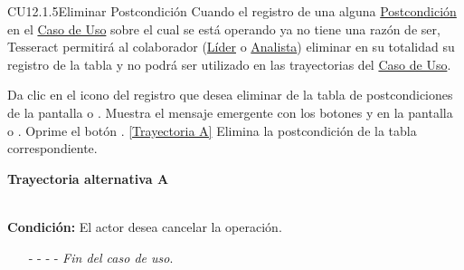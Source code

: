 	\begin{UseCase}{CU12.1.5}{Eliminar Postcondición}{
		Cuando el registro de una  alguna \hyperlink{entidadPostcondicion}{Postcondición} en el \hyperlink{casoUso}{Caso de Uso} sobre el cual se está operando ya no tiene una razón de ser, Tesseract permitirá al colaborador (\hyperlink{jefe}{Líder} o \hyperlink{analista}{Analista}) eliminar en su totalidad su registro de la tabla y no podrá ser utilizado en las trayectorias del \hyperlink{casoUso}{Caso de Uso}.
	}
\end{UseCase}
\begin{UCtrayectoria}
	\UCpaso[\UCactor] Da clic en el icono \eliminar del registro que desea eliminar de la tabla de postcondiciones de la pantalla  o .
	\UCpaso[\UCsist] Muestra el mensaje emergente  con los botones  y  en la pantalla  o .
	\UCpaso[\UCactor] Oprime el botón . \hyperlink{CU12-1-5:TAA}{[Trayectoria A]}
	\UCpaso[\UCsist] Elimina la postcondición de la tabla correspondiente.
\end{UCtrayectoria}		
\hypertarget{CU12-1-5:TAA}{\textbf{Trayectoria alternativa A}}\\
\noindent \textbf{Condición:} El actor desea cancelar la operación.
\begin{enumerate}
	\UCpaso[\UCactor] Solicita cancelar la operación oprimiendo el botón  de la pantalla .
	\UCpaso[\UCsist] Muestra la pantalla  o .
	\item[- -] - - {\em {Fin del caso de uso}}.%
\end{enumerate}
